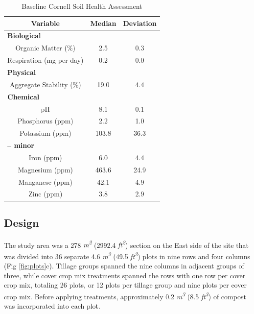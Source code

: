 \documentclass[
  12pt,
]{article}
\begin{document}
\begin{table}

\caption{\label{tab:chem}Baseline Cornell Soil Health Assessment}
\centering
\begin{tabular}[t]{c|c|c}
\hline
Variable & Median & Deviation\\
\hline
\multicolumn{3}{l}{\textbf{Biological}}\\
\hline
\hspace{1em}Organic Matter (\%) & 2.5 & 0.3\\
\hline
\hspace{1em}Respiration (mg per day) & 0.2 & 0.0\\
\hline
\multicolumn{3}{l}{\textbf{Physical}}\\
\hline
\hspace{1em}Aggregate Stability (\%) & 19.0 & 4.4\\
\hline
\multicolumn{3}{l}{\textbf{Chemical}}\\
\hline
\hspace{1em}pH & 8.1 & 0.1\\
\hline
\hspace{1em}Phosphorus (ppm) & 2.2 & 1.0\\
\hline
\hspace{1em}Potassium (ppm) & 103.8 & 36.3\\
\hline
\multicolumn{3}{l}{\textbf{-- minor}}\\
\hline
\hspace{1em}\hspace{1em}Iron (ppm) & 6.0 & 4.4\\
\hline
\hspace{1em}\hspace{1em}Magnesium (ppm) & 463.6 & 24.9\\
\hline
\hspace{1em}\hspace{1em}Manganese (ppm) & 42.1 & 4.9\\
\hline
\hspace{1em}\hspace{1em}Zinc (ppm) & 3.8 & 2.9\\
\hline
\end{tabular}
\end{table}

\hypertarget{design}{%
\subsection{Design}\label{design}}

The study area was a 278 \emph{m\textsuperscript{2}} (2992.4 \emph{ft\textsuperscript{2}}) section on the East side of the site that was divided into 36 separate 4.6 \emph{m\textsuperscript{2}} (49.5 \emph{ft\textsuperscript{2}}) plots in nine rows and four columns (Fig \ref{fig:plots}c).
Tillage groups spanned the nine columns in adjacent groups of three, while cover crop mix treatments spanned the rows with one row per cover crop mix, totaling 26 plots, or 12 plots per tillage group and nine plots per cover crop mix.
Before applying treatments, approximately 0.2 \emph{m\textsuperscript{3}} (8.5 \emph{ft\textsuperscript{3}}) of compost was incorporated into each plot.
\end{document}
